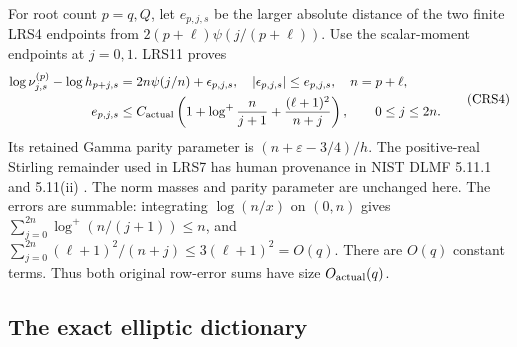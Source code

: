 For root count $p=q,Q$, let $e_{p,j,s}$ be the larger absolute distance
of the two finite LRS4 endpoints from $2(p+\ell)\psi(j/(p+\ell))$.
Use the scalar-moment endpoints at $j=0,1$. LRS11 proves
\[
\begin{split}
 \log\nu^{(p)}_{j,s}-\log h_{p+j,s}
 &=2n\psi(j/n)+\epsilon_{p,j,s},\quad
 |\epsilon_{p,j,s}|\le e_{p,j,s},\quad n=p+\ell,\\
 e_{p,j,s}&\le C_{\rm actual}
 \left(1+\log^+\frac{n}{j+1}+\frac{(\ell+1)^2}{n+j}\right),
 \qquad 0\le j\le2n .
\end{split}                                                    \tag{CRS4}
\]
Its retained Gamma parity parameter is $(n+\varepsilon-3/4)/h$.
The positive-real Stirling remainder used in LRS7 has human provenance
in NIST DLMF 5.11.1 and 5.11(ii) \cite[\S5.11]{crs:dlmf5}.
The norm masses and parity parameter are unchanged here.
The errors are summable: integrating $\log(n/x)$ on $(0,n)$ gives
$\sum_{j=0}^{2n}\log^+(n/(j+1))\le n$, and
$\sum_{j=0}^{2n}(\ell+1)^2/(n+j)\le3(\ell+1)^2=O(q)$.
There are $O(q)$ constant terms. Thus both original row-error sums
have size $O_{\rm actual}(q)$.

\subsection{The exact elliptic dictionary}

